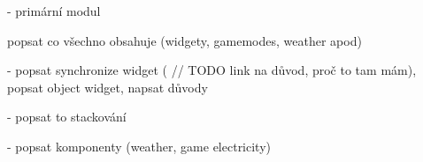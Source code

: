 
- primární modul

popsat co všechno obsahuje (widgety, gamemodes, weather apod)

- popsat synchronize widget ( // TODO link na důvod, proč to tam mám), popsat object widget, napsat důvody

- popsat to stackování 

- popsat komponenty
(weather, game electricity)